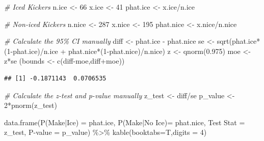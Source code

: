 \documentclass[
  11pt,
]{book}
\newenvironment{Shaded}{\begin{snugshade}}{\end{snugshade}}
\newcommand{\AttributeTok}[1]{\textcolor[rgb]{0.77,0.63,0.00}{#1}}
\newcommand{\CommentTok}[1]{\textcolor[rgb]{0.56,0.35,0.01}{\textit{#1}}}
\newcommand{\DecValTok}[1]{\textcolor[rgb]{0.00,0.00,0.81}{#1}}
\newcommand{\FloatTok}[1]{\textcolor[rgb]{0.00,0.00,0.81}{#1}}
\newcommand{\FunctionTok}[1]{\textcolor[rgb]{0.00,0.00,0.00}{#1}}
\newcommand{\NormalTok}[1]{#1}
\newcommand{\OtherTok}[1]{\textcolor[rgb]{0.56,0.35,0.01}{#1}}
\newcommand{\SpecialCharTok}[1]{\textcolor[rgb]{0.00,0.00,0.00}{#1}}
\newcommand{\StringTok}[1]{\textcolor[rgb]{0.31,0.60,0.02}{#1}}
\theoremstyle{definition}
\theoremstyle{definition}
\theoremstyle{definition}
\theoremstyle{definition}
\theoremstyle{remark}
\begin{document}
\begin{Shaded}
\begin{Highlighting}[]
\CommentTok{\# Iced Kickers}
\NormalTok{n.ice }\OtherTok{\textless{}{-}} \DecValTok{66}
\NormalTok{x.ice }\OtherTok{\textless{}{-}} \DecValTok{41}
\NormalTok{phat.ice }\OtherTok{\textless{}{-}}\NormalTok{ x.ice}\SpecialCharTok{/}\NormalTok{n.ice}

\CommentTok{\# Non{-}iced Kickers}
\NormalTok{n.nice }\OtherTok{\textless{}{-}} \DecValTok{287}
\NormalTok{x.nice }\OtherTok{\textless{}{-}} \DecValTok{195}
\NormalTok{phat.nice }\OtherTok{\textless{}{-}}\NormalTok{ x.nice}\SpecialCharTok{/}\NormalTok{n.nice}

\CommentTok{\# Calculate the 95\% CI manually}
\NormalTok{diff }\OtherTok{\textless{}{-}}\NormalTok{ phat.ice }\SpecialCharTok{{-}}\NormalTok{ phat.nice}
\NormalTok{se }\OtherTok{\textless{}{-}} \FunctionTok{sqrt}\NormalTok{(phat.ice}\SpecialCharTok{*}\NormalTok{(}\DecValTok{1}\SpecialCharTok{{-}}\NormalTok{phat.ice)}\SpecialCharTok{/}\NormalTok{n.ice }\SpecialCharTok{+}\NormalTok{ phat.nice}\SpecialCharTok{*}\NormalTok{(}\DecValTok{1}\SpecialCharTok{{-}}\NormalTok{phat.nice)}\SpecialCharTok{/}\NormalTok{n.nice)}
\NormalTok{z }\OtherTok{\textless{}{-}} \FunctionTok{qnorm}\NormalTok{(}\FloatTok{0.975}\NormalTok{)}
\NormalTok{moe }\OtherTok{\textless{}{-}}\NormalTok{ z}\SpecialCharTok{*}\NormalTok{se}
\NormalTok{(bounds }\OtherTok{\textless{}{-}} \FunctionTok{c}\NormalTok{(diff}\SpecialCharTok{{-}}\NormalTok{moe,diff}\SpecialCharTok{+}\NormalTok{moe))}
\end{Highlighting}
\end{Shaded}

\begin{verbatim}
## [1] -0.1871143  0.0706535
\end{verbatim}

\begin{Shaded}
\begin{Highlighting}[]
\CommentTok{\# Calculate the z{-}test and p{-}value manually}
\NormalTok{z\_test }\OtherTok{\textless{}{-}}\NormalTok{ diff}\SpecialCharTok{/}\NormalTok{se}
\NormalTok{p\_value }\OtherTok{\textless{}{-}} \DecValTok{2}\SpecialCharTok{*}\FunctionTok{pnorm}\NormalTok{(z\_test)}

\FunctionTok{data.frame}\NormalTok{(}\StringTok{\textasciigrave{}}\AttributeTok{P(Make|Ice)}\StringTok{\textasciigrave{}} \OtherTok{=}\NormalTok{ phat.ice, }\StringTok{\textasciigrave{}}\AttributeTok{P(Make|No Ice)}\StringTok{\textasciigrave{}}\OtherTok{=}\NormalTok{ phat.nice,}
           \StringTok{\textasciigrave{}}\AttributeTok{Test Stat}\StringTok{\textasciigrave{}} \OtherTok{=}\NormalTok{ z\_test, }\StringTok{\textasciigrave{}}\AttributeTok{P{-}value}\StringTok{\textasciigrave{}} \OtherTok{=}\NormalTok{ p\_value)  }\SpecialCharTok{\%\textgreater{}\%} 
  \FunctionTok{kable}\NormalTok{(}\AttributeTok{booktabs=}\NormalTok{T,}\AttributeTok{digits =} \DecValTok{4}\NormalTok{)}
\end{Highlighting}
\end{Shaded}
\end{document}
